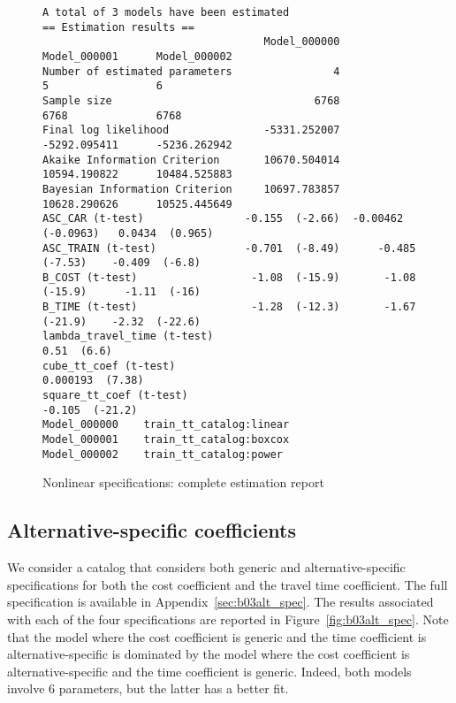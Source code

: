 \documentclass[12pt,a4paper]{article}
\begin{document}
\begin{landscape}
  \begin{figure}[p]
\begin{lstlisting}
A total of 3 models have been estimated
== Estimation results ==
                                   Model_000000         Model_000001      Model_000002
Number of estimated parameters                4                    5                 6
Sample size                                6768                 6768              6768
Final log likelihood               -5331.252007         -5292.095411      -5236.262942
Akaike Information Criterion       10670.504014         10594.190822      10484.525883
Bayesian Information Criterion     10697.783857         10628.290626      10525.445649
ASC_CAR (t-test)                -0.155  (-2.66)  -0.00462  (-0.0963)   0.0434  (0.965)
ASC_TRAIN (t-test)              -0.701  (-8.49)      -0.485  (-7.53)    -0.409  (-6.8)
B_COST (t-test)                  -1.08  (-15.9)       -1.08  (-15.9)      -1.11  (-16)
B_TIME (t-test)                  -1.28  (-12.3)       -1.67  (-21.9)    -2.32  (-22.6)
lambda_travel_time (t-test)                              0.51  (6.6)
cube_tt_coef (t-test)                                                 0.000193  (7.38)
square_tt_coef (t-test)                                                -0.105  (-21.2)
Model_000000	train_tt_catalog:linear
Model_000001	train_tt_catalog:boxcox
Model_000002	train_tt_catalog:power
\end{lstlisting}
\caption{\label{fig:b02nonlinear}Nonlinear specifications: complete estimation report}
  \end{figure}
\end{landscape}

\subsection{Alternative-specific coefficients}

We consider a catalog that considers both generic and alternative-specific specifications for both the cost coefficient and the travel time coefficient.  The
full specification is available in
Appendix~\ref{sec:b03alt_spec}. The results associated with each of
the four specifications are reported in
Figure~\vref{fig:b03alt_spec}. Note that the model where the cost coefficient is generic and the time coefficient is alternative-specific is dominated by the model where the cost coefficient is alternative-specific and the time coefficient is generic. Indeed, both models involve 6 parameters, but the latter has a better fit.
\end{document}
